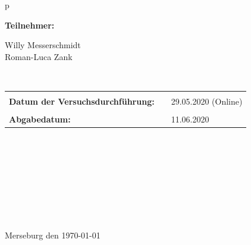 \begin{center}
\begin{tabular}{p{\textwidth}}

\begin{center}
\Large{\textbf{Teilnehmer:}} \\ 
\end{center}
\begin{center}
\large{Willy Messerschmidt \\
	Roman-Luca Zank} \\
\end{center}


\\

\begin{center}
\begin{tabular}{lll}
&&\\
\large{\textbf{Datum der Versuchsdurchführung:}}&& \large{29.05.2020 (Online)}\\
&&\\
\large{\textbf{Abgabedatum:}}&& \large{11.06.2020}
\end{tabular}
\end{center}

\\ \\ \\ \\ \\ \\ \\ \\ 
\large{Merseburg den \today}

\end{tabular}
\end{center}
